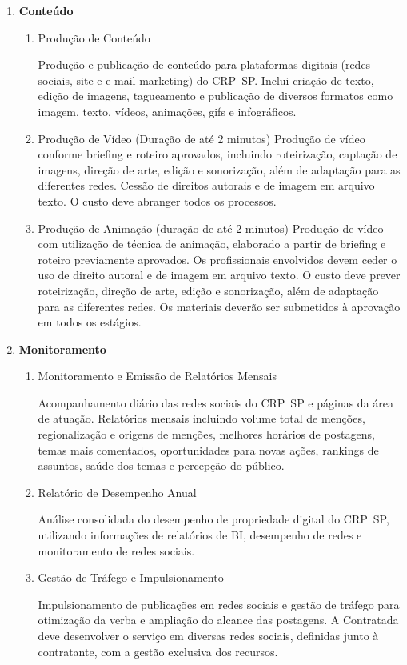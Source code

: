 \documentclass[oneside,a4paper,article]{memoir}
\begin{document}
\begin{enumerate}
	\item
	    \textbf{Conteúdo}
			\begin{enumerate}
				\item
	      		Produção de Conteúdo

				Produção e publicação de conteúdo para plataformas digitais (redes sociais, site e e-mail marketing) do CRP~SP. Inclui criação de texto, edição de imagens, tagueamento e publicação de diversos formatos como imagem, texto, vídeos, animações, gifs e infográficos.

				\item
	    		Produção de Vídeo (Duração de até 2 minutos)
				Produção de vídeo conforme briefing e roteiro aprovados, incluindo roteirização, captação de imagens, direção de arte, edição e sonorização, além de adaptação para as diferentes redes. Cessão de direitos autorais e de imagem em arquivo texto. O custo deve abranger todos os processos.
				\item
	    		Produção de Animação (duração de até 2 minutos)
				Produção de vídeo com utilização de técnica de animação, elaborado a partir de briefing e roteiro previamente aprovados. Os profissionais envolvidos devem ceder o uso de direito autoral e de imagem em arquivo texto. O custo deve prever roteirização, direção de arte, edição e sonorização, além de adaptação para as diferentes redes. Os materiais deverão ser submetidos à aprovação em todos os estágios.
			\end{enumerate}
	\item
	    \textbf{Monitoramento}
			\begin{enumerate}
				\item
	      		Monitoramento e Emissão de Relatórios Mensais

				Acompanhamento diário das redes sociais do CRP~SP e páginas da área de atuação. Relatórios mensais incluindo volume total de menções, regionalização e origens de menções, melhores horários de postagens, temas mais comentados, oportunidades para novas ações, rankings de assuntos, saúde dos temas e percepção do público.

				\item
	      		Relatório de Desempenho Anual

				Análise consolidada do desempenho de propriedade digital do CRP~SP, utilizando informações de relatórios de BI, desempenho de redes e monitoramento de redes sociais.
				\item
	      		Gestão de Tráfego e Impulsionamento

				Impulsionamento de publicações em redes sociais e gestão de tráfego para otimização da verba e ampliação do alcance das postagens. A Contratada deve desenvolver o serviço em diversas redes sociais, definidas junto à
				contratante, com a gestão exclusiva dos recursos.
			\end{enumerate}
	\end{enumerate}
\end{document}

